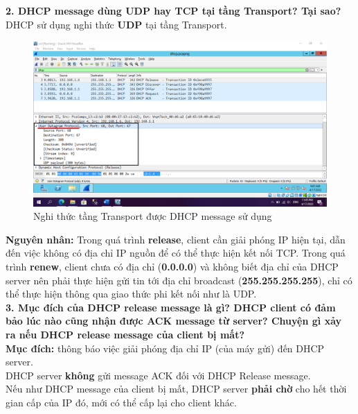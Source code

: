 \textbf{2.	DHCP message dùng UDP hay TCP tại tầng Transport? Tại sao?}\\
DHCP sử dụng nghi thức \textbf{UDP} tại tầng Transport.
\begin{figure}[H]
\begin{center}
\includegraphics[scale=.4]{../figures/p4/p4_2}
\end{center}
\caption{Nghi thức tầng Transport được DHCP message sử dụng}
\end{figure}
\textbf{Nguyên nhân:} Trong quá trình \textbf{release}, client cần giải phóng IP hiện tại, dẫn đến việc không có địa chỉ IP nguồn để có thể thực hiện kết nối TCP. Trong quá trình \textbf{renew}, client chưa có địa chỉ (\textbf{0.0.0.0}) và không biết địa chỉ của DHCP server nên phải thực hiện gửi tin tới địa chỉ broadcast (\textbf{255.255.255.255}), chỉ có thể thực hiện thông qua giao thức phi kết nối như là UDP.\\

\textbf{3.	Mục đích của DHCP release message là gì? DHCP client có đảm bảo lúc nào cũng nhận được ACK message từ server? Chuyện gì xảy ra nếu DHCP release message của client bị mất?}\\
\textbf{Mục đích:} thông báo việc giải phóng địa chỉ IP (của máy gửi) đến DHCP server.\\
DHCP server \textbf{không} gửi message ACK đối với DHCP Release message.\\
Nếu như DHCP message của client bị mất, DHCP server \textbf{phải chờ} cho hết thời gian cấp của IP đó, mới có thể cấp lại cho client khác.\\

